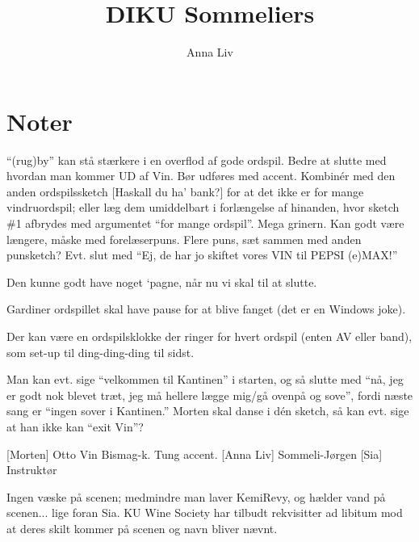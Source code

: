 \documentclass{article}
\title{DIKU Sommeliers}                   %
\author{Anna Liv}
\begin{document}
                
\maketitle
\section*{Noter}                %
``(rug)by'' kan stå stærkere i en overflod af gode ordspil. Bedre at slutte med hvordan man kommer UD af Vin. Bør udføres med accent.
Kombinér med den anden ordspilssketch [Haskall du ha' bank?]
for at det ikke er for mange vindruordspil; eller læg dem umiddelbart i forlængelse af hinanden, hvor sketch \#1 afbrydes med argumentet ``for mange ordspil''.
Mega grinern. Kan godt være længere, måske med forelæserpuns.
Flere puns, sæt sammen med anden punsketch?
Evt. slut med ``Ej, de har jo skiftet vores VIN til PEPSI (e)MAX!''

Den kunne godt have noget `pagne, når nu vi skal til at slutte.

Gardiner ordspillet skal have pause for at blive fanget (det er en Windows joke).

Der kan være en ordspilsklokke der ringer for hvert ordspil (enten AV eller band), som set-up til ding-ding-ding til sidst.

Man kan evt. sige ``velkommen til Kantinen'' i starten, og så slutte med ``nå, jeg er godt nok blevet træt, jeg må hellere lægge mig/gå ovenpå og sove'', fordi næste sang er ``ingen sover i Kantinen.'' Morten skal danse i dén sketch, så kan evt. sige at han ikke kan ``exit Vin''?



\begin{roles}
[Morten] Otto Vin Bismag-k. Tung accent.
[Anna Liv] Sommeli-Jørgen
[Sia] Instruktør
\end{roles}

\begin{props}
     Ingen væske på scenen; medmindre man laver KemiRevy, og hælder vand på scenen... lige foran Sia.
     KU Wine Society har tilbudt rekvisitter ad libitum mod at deres skilt kommer på scenen og navn bliver nævnt.
\end{props}
\end{document}
